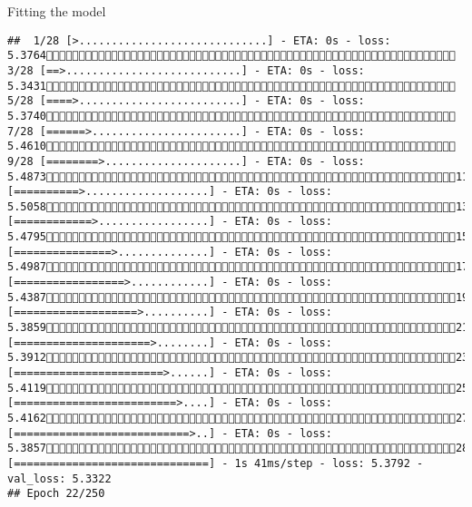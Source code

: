 \documentclass[
  ignorenonframetext,
]{beamer}
\begin{document}
\begin{frame}[fragile]{Fitting the model}
\begin{verbatim}
##  1/28 [>.............................] - ETA: 0s - loss: 5.3764 3/28 [==>...........................] - ETA: 0s - loss: 5.3431 5/28 [====>.........................] - ETA: 0s - loss: 5.3740 7/28 [======>.......................] - ETA: 0s - loss: 5.4610 9/28 [========>.....................] - ETA: 0s - loss: 5.487311/28 [==========>...................] - ETA: 0s - loss: 5.505813/28 [============>.................] - ETA: 0s - loss: 5.479515/28 [===============>..............] - ETA: 0s - loss: 5.498717/28 [=================>............] - ETA: 0s - loss: 5.438719/28 [===================>..........] - ETA: 0s - loss: 5.385921/28 [=====================>........] - ETA: 0s - loss: 5.391223/28 [=======================>......] - ETA: 0s - loss: 5.411925/28 [=========================>....] - ETA: 0s - loss: 5.416227/28 [===========================>..] - ETA: 0s - loss: 5.385728/28 [==============================] - 1s 41ms/step - loss: 5.3792 - val_loss: 5.3322
## Epoch 22/250

\end{verbatim}
\end{frame}
\end{document}

